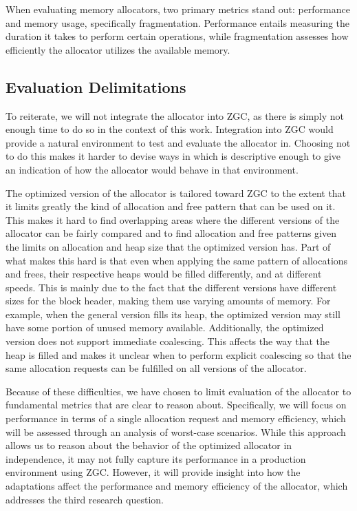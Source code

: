 
When evaluating memory allocators, two primary metrics stand out: performance and memory usage, specifically fragmentation. Performance entails measuring the duration it takes to perform certain operations, while fragmentation assesses how efficiently the allocator utilizes the available memory.

\subsection{Evaluation Delimitations}

To reiterate, we will not integrate the allocator into ZGC, as there is simply not enough time to do so in the context of this work. Integration into ZGC would provide a natural environment to test and evaluate the allocator in. Choosing not to do this makes it harder to devise ways in which is descriptive enough to give an indication of how the allocator would behave in that environment. 

The optimized version of the allocator is tailored toward ZGC to the extent that it limits greatly the kind of allocation and free pattern that can be used on it. This makes it hard to find overlapping areas where the different versions of the allocator can be fairly compared and to find allocation and free patterns given the limits on allocation and heap size that the optimized version has. Part of what makes this hard is that even when applying the same pattern of allocations and frees, their respective heaps would be filled differently, and at different speeds. This is mainly due to the fact that the different versions have different sizes for the block header, making them use varying amounts of memory. For example, when the general version fills its heap, the optimized version may still have some portion of unused memory available. Additionally, the optimized version does not support immediate coalescing. This affects the way that the heap is filled and makes it unclear when to perform explicit coalescing so that the same allocation requests can be fulfilled on all versions of the allocator.

Because of these difficulties, we have chosen to limit evaluation of the allocator to fundamental metrics that are clear to reason about. Specifically, we will focus on performance in terms of a single allocation request and memory efficiency, which will be assessed through an analysis of worst-case scenarios. While this approach allows us to reason about the behavior of the optimized allocator in independence, it may not fully capture its performance in a production environment using ZGC. However, it will provide insight into how the adaptations affect the performance and memory efficiency of the allocator, which addresses the third research question.

